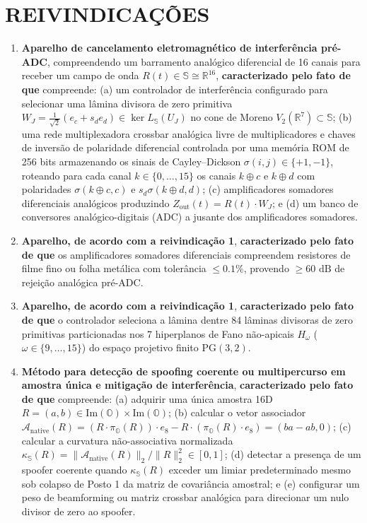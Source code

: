 \documentclass[12pt,a4paper]{article}
\begin{document}
\section*{REIVINDICA\c{C}\~OES}
\begin{enumerate}[leftmargin=20pt,itemsep=4pt]
    \item \textbf{Aparelho de cancelamento eletromagn\'etico de interfer\^encia pr\'e-ADC}, compreendendo um barramento anal\'ogico diferencial de 16 canais para receber um campo de onda $R(t) \in \mathbb{S} \cong \mathbb{R}^{16}$, \textbf{caracterizado pelo fato de que} compreende: (a) um controlador de interfer\^encia configurado para selecionar uma l\^amina divisora de zero primitiva $W_J = \frac{1}{\sqrt{2}}(e_c + s_d e_d) \in \ker L_{\mathbb{S}}(U_J)$ no cone de Moreno $V_2(\mathbb{R}^7) \subset \mathbb{S}$; (b) uma rede multiplexadora crossbar anal\'ogica livre de multiplicadores e chaves de invers\~ao de polaridade diferencial controlada por uma mem\'oria ROM de 256 bits armazenando os sinais de Cayley--Dickson $\sigma(i, j) \in \{+1, -1\}$, roteando para cada canal $k \in \{0,\dots,15\}$ os canais $k \oplus c$ e $k \oplus d$ com polaridades $\sigma(k \oplus c, c)$ e $s_d \sigma(k \oplus d, d)$; (c) amplificadores somadores diferenciais anal\'ogicos produzindo $Z_{\mathrm{out}}(t) = R(t) \cdot W_J$; e (d) um banco de conversores anal\'ogico-digitais (ADC) a jusante dos amplificadores somadores.

    \item \textbf{Aparelho, de acordo com a reivindica\c{c}\~ao 1}, \textbf{caracterizado pelo fato de que} os amplificadores somadores diferenciais compreendem resistores de filme fino ou folha met\'alica com toler\^ancia $\le 0.1\%$, provendo $\ge 60\text{ dB}$ de rejei\c{c}\~ao anal\'ogica pr\'e-ADC.

    \item \textbf{Aparelho, de acordo com a reivindica\c{c}\~ao 1}, \textbf{caracterizado pelo fato de que} o controlador seleciona a l\^amina dentre 84 l\^aminas divisoras de zero primitivas particionadas nos 7 hiperplanos de Fano n\~ao-apicais $H_\omega$ ($\omega \in \{9,\dots,15\}$) do espa\c{c}o projetivo finito $\mathrm{PG}(3,2)$.

    \item \textbf{M\'etodo para detec\c{c}\~ao de spoofing coerente ou multipercurso em amostra \'unica e mitiga\c{c}\~ao de interfer\^encia}, \textbf{caracterizado pelo fato de que} compreende: (a) adquirir uma \'unica amostra 16D $R = (a, b) \in \mathrm{Im}(\mathbb{O}) \times \mathrm{Im}(\mathbb{O})$; (b) calcular o vetor associador $\mathcal{A}_{\mathrm{native}}(R) = (R \cdot \pi_{\mathbb{O}}(R)) \cdot e_8 - R \cdot (\pi_{\mathbb{O}}(R) \cdot e_8) = (ba - ab, 0)$; (c) calcular a curvatura n\~ao-associativa normalizada $\kappa_{\mathbb{S}}(R) = \|\mathcal{A}_{\mathrm{native}}(R)\|_2 / \|R\|_2^2 \in [0, 1]$; (d) detectar a presen\c{c}a de um spoofer coerente quando $\kappa_{\mathbb{S}}(R)$ exceder um limiar predeterminado mesmo sob colapso de Posto 1 da matriz de covari\^ancia amostral; e (e) configurar um peso de beamforming ou matriz crossbar anal\'ogica para direcionar um nulo divisor de zero ao spoofer.


\end{enumerate}
\end{document}
